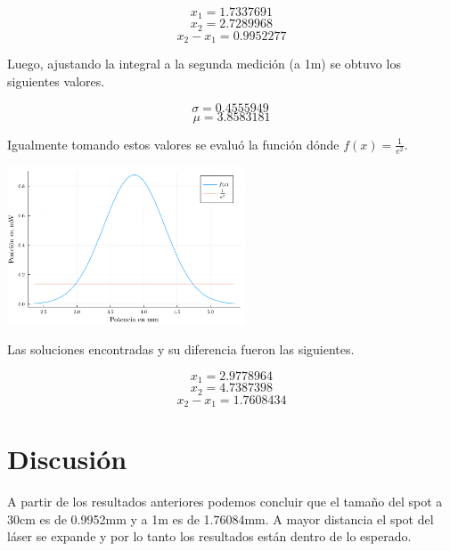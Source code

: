 \documentclass[twocolumn]{article}
\begin{document}
		$$
		x_1=1.7337691
		$$
		$$
		x_2=2.7289968
		$$
		$$
		x_2 - x_1 = 0.9952277
		$$

		Luego, ajustando la integral a la segunda medición (a 1m) se obtuvo los siguientes valores.

		$$
		\sigma = 0.4555949 \
		$$
		$$
		\mu = 3.8583181
		$$

		Igualmente tomando estos valores se evaluó la función dónde $f(x) = \frac{1}{e^2}$.

		\begin{center}
			\includegraphics[width=200pt]{img/normal_2.pdf}
		\end{center}

		Las soluciones encontradas y su diferencia fueron las siguientes.

		$$
		x_1=2.9778964
		$$
		$$
		x_2=4.7387398
		$$
		$$
		x_2 - x_1 = 1.7608434
		$$

	\section{Discusión}
		A partir de los resultados anteriores podemos concluir que el tamaño del spot a 30cm es de 0.9952mm y a 1m es de 1.76084mm. A mayor distancia el spot del láser se expande y por lo tanto los resultados están dentro de lo esperado.
\end{document}
